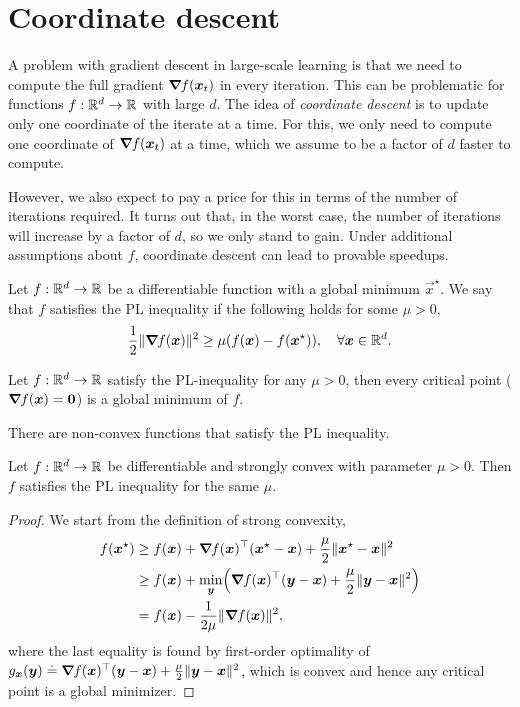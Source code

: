 \section{Coordinate descent}

A problem with gradient descent in large-scale learning is that we need to compute the full
gradient $\bm{\nabla}_{\! } f(\bm{x}_t)$ in every iteration. This can be problematic for functions $f: \mathbb{R}^d
    \to \mathbb{R}$ with large $d$. The idea of \textit{coordinate descent} is to update only one coordinate of
the iterate at a time. For this, we only need to compute one coordinate of $\bm{\nabla}_{\! } f(\bm{x}_t)$
at a time, which we assume to be a factor of $d$ faster to compute.

However, we also expect to pay a price for this in terms of the number of iterations required. It
turns out that, in the worst case, the number of iterations will increase by a factor of $d$, so we
only stand to gain. Under additional assumptions about $f$, coordinate descent can lead to provable
speedups.

\begin{definition}
    Let $f: \mathbb{R}^d \to \mathbb{R}$ be a differentiable function with a global minimum $\vec{x}^\star$. We say
    that $f$ satisfies the PL inequality if the following holds for some $\mu > 0$, \[
        \frac{1}{2} \| \bm{\nabla}_{\! } f(\bm{x}) \|^2 \geq \mu (f(\bm{x}) - f(\bm{x}^\star)), \quad \forall \bm{x} \in \mathbb{R}^d.
    \]
\end{definition}

\begin{corollary}
    Let $f: \mathbb{R}^d \to \mathbb{R}$ satisfy the PL-inequality for any $\mu > 0$, then every critical point
    ($\bm{\nabla}_{\! } f(\bm{x}) = \bm{0}$) is a global minimum of $f$.
\end{corollary}

There are non-convex functions that satisfy the PL inequality.

\begin{lemma}
    Let $f: \mathbb{R}^d \to \mathbb{R}$ be differentiable and strongly convex with parameter $\mu > 0$. Then $f$
    satisfies the PL inequality for the same $\mu$.
\end{lemma}

\begin{proof}
    We start from the definition of strong convexity,
    \begin{align*}
        f(\vec{x}^\star) & \geq f(\vec{x}) + \transpose{\grad{f(\vec{x})}{}}(\vec{x}^\star - \vec{x}) + \frac{\mu}{2} \| \vec{x}^\star - \vec{x} \|^2              \\
                         & \geq f(\vec{x}) + \min_{\vec{y}} \lft( \transpose{\grad{f(\vec{x})}{}}(\vec{y}-\vec{x}) + \frac{\mu}{2} \| \vec{y} - \vec{x} \|^2 \rgt) \\
                         & = f(\vec{x}) - \frac{1}{2 \mu} \| \grad{f(\vec{x})}{} \|^2,
    \end{align*}
    where the last equality is found by first-order optimality of $g_{\bm{x}}(\bm{y}) \doteq
        \bm{\nabla}_{\! } f(\bm{x})^\top(\bm{y} - \bm{x}) + \frac{\mu}{2} \| \bm{y} - \bm{x} \|^2$,
    which is convex and hence any critical point is a global minimizer.
\end{proof}

